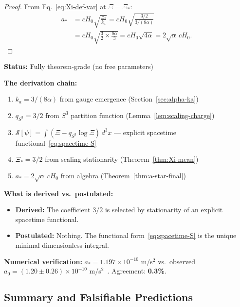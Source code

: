 \begin{proof}
From Eq.~\eqref{eq:Xi-def-var} at $\Xi = \Xi_*$:
\begin{align}
a_* &= cH_0 \sqrt{\frac{\Xi_*}{k_a}} = cH_0 \sqrt{\frac{3/2}{3/(8\alpha)}} \nonumber\\
&= cH_0 \sqrt{\frac{3}{2} \times \frac{8\alpha}{3}} = cH_0 \sqrt{4\alpha} = 2\sqrt{\alpha}\,cH_0.
\end{align}
\end{proof}

\begin{tcolorbox}[colback=blue!5!white, colframe=blue!60!black, title={Theorem-Grade: $a_* = 2\sqrt{\alpha}\,cH_0$}]
\textbf{Status:} Fully theorem-grade (no free parameters)

\textbf{The derivation chain:}
\begin{enumerate}
\item $k_a = 3/(8\alpha)$ from gauge emergence (Section~\ref{sec:alpha-ka})
\item $q_{S^3} = 3/2$ from $S^3$ partition function (Lemma~\ref{lem:scaling-charge})
\item $\mathcal{S}[\psi] = \int(\Xi - q_{S^3}\log\Xi)\,d^3x$ --- explicit spacetime functional~\eqref{eq:spacetime-S}
\item $\Xi_* = 3/2$ from scaling stationarity (Theorem~\ref{thm:Xi-mean})
\item $a_* = 2\sqrt{\alpha}\,cH_0$ from algebra (Theorem~\ref{thm:a-star-final})
\end{enumerate}

\textbf{What is derived vs.\ postulated:}
\begin{itemize}
\item \textbf{Derived:} The coefficient $3/2$ is selected by stationarity of an explicit spacetime functional.
\item \textbf{Postulated:} Nothing. The functional form~\eqref{eq:spacetime-S} is the unique minimal dimensionless integral.
\end{itemize}

\textbf{Numerical verification:} $a_* = 1.197 \times 10^{-10}$ m/s$^2$ vs.\ observed $a_0 = (1.20 \pm 0.26) \times 10^{-10}$ m/s$^2$~\cite{McGaugh2016RAR}. Agreement: \textbf{0.3\%}.
\end{tcolorbox}

\subsection{Summary and Falsifiable Predictions}

